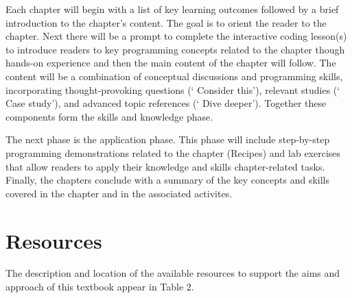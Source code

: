 \documentclass[
  letterpaper,
]{latex/krantz}
\theoremstyle{definition}
\theoremstyle{remark}
\begin{document}
Each chapter will begin with a list of key learning outcomes followed by
a brief introduction to the chapter's content. The goal is to orient the
reader to the chapter. Next there will be a prompt to complete the
interactive coding lesson(s) to introduce readers to key programming
concepts related to the chapter though hands-on experience and then the
main content of the chapter will follow. The content will be a
combination of conceptual discussions and programming skills,
incorporating thought-provoking questions (` Consider
this'), relevant studies (` Case study'), and advanced
topic references (` Dive deeper'). Together these
components form the skills and knowledge phase.

The next phase is the application phase. This phase will include
step-by-step programming demonstrations related to the chapter (Recipes)
and lab exercises that allow readers to apply their knowledge and skills
chapter-related tasks. Finally, the chapters conclude with a summary of
the key concepts and skills covered in the chapter and in the associated
activites.

\section*{Resources}\label{sec-p-resources}


The description and location of the available resources to support the
aims and approach of this textbook appear in Table 2.
\end{document}
